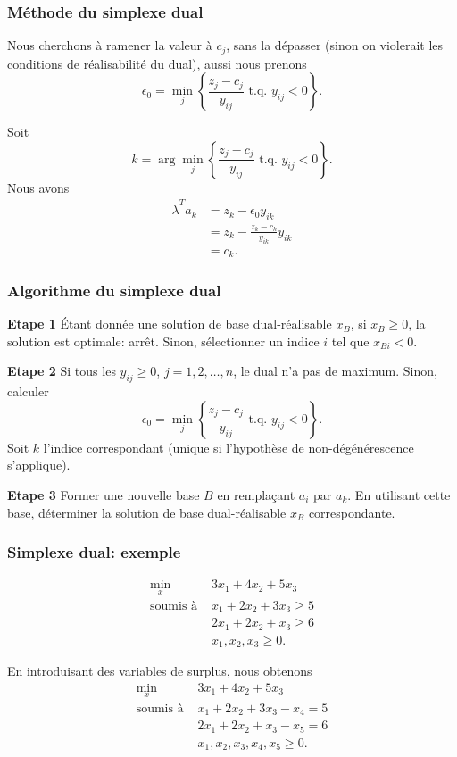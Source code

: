 \documentclass[usepdftitle=false]{beamer}
\begin{document}
\begin{frame}
	\frametitle{Méthode du simplexe dual}
	
	Nous cherchons à ramener la valeur à $c_j$, sans la dépasser (sinon on violerait les conditions de réalisabilité du dual), aussi nous prenons
	\[
	\epsilon_0 = \min_j \left\lbrace \frac{z_j-c_j}{y_{ij}}\mbox{ t.q. } y_{ij} < 0 \right\rbrace.
	\]
	
	\mbox{}
	
	Soit
	\[
	k = \arg\min_j \left\lbrace \frac{z_j-c_j}{y_{ij}}\mbox{ t.q. } y_{ij} < 0 \right\rbrace.
	\]
	Nous avons
	\begin{align*}
		\overline{\lambda}^T a_k &= z_k - \epsilon_0 y_{ik} \\
		&= z_k - \frac{z_k-c_k}{y_{ik}} y_{ik} \\
		& = c_k. 
	\end{align*}
	
\end{frame}

\begin{frame}
	\frametitle{Algorithme du simplexe dual}
	
	{\bf Etape 1}
	\'Etant donnée une solution de base dual-réalisable $x_B$, si $x_B \geq 0$, la solution est optimale: arrêt. Sinon, sélectionner un indice $i$ tel que $x_{Bi} < 0$.
	
	\mbox{}
	
	{\bf Etape 2}
	Si tous les $y_{ij} \geq 0$, $j = 1, 2,\ldots,n$, le dual n'a pas de maximum.
	Sinon, calculer
	\[
	\epsilon_0 = \min_j \left\lbrace \frac{z_j-c_j}{y_{ij}}\mbox{ t.q. } y_{ij} < 0 \right\rbrace.
	\]
	Soit $k$ l'indice correspondant (unique si l'hypothèse de non-dégénérescence s'applique).
	
	\mbox{}
	
	{\bf Etape 3}
	Former une nouvelle base $B$ en remplaçant $a_i$ par $a_k$.
	En utilisant cette base, déterminer la solution de base dual-réalisable $x_B$ correspondante.
	
\end{frame}

\begin{frame}
	\frametitle{Simplexe dual: exemple}
	
	\begin{align*}
		\min_x \ & 3x_1 + 4x_2 + 5x_3 \\
		\mbox{soumis à } & x_1 + 2x_2 + 3x_3 \geq 5 \\
		& 2x_1 + 2x_2 + x_3 \geq 6 \\
		& x_1, x_2, x_3 \geq 0.
	\end{align*}
	
	\mbox{}
	
	En introduisant des variables de surplus, nous obtenons
	\begin{align*}
		\min_x \ & 3x_1 + 4x_2 + 5x_3 \\
		\mbox{soumis à } & x_1 + 2x_2 + 3x_3 - x_4 = 5 \\
		& 2x_1 + 2x_2 + x_3 -x_5 = 6 \\
		& x_1, x_2, x_3, x_4, x_5 \geq 0.
	\end{align*}
	
\end{frame}
\end{document}
